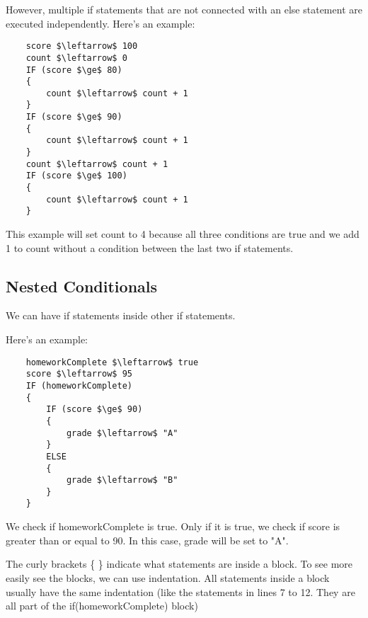 \documentclass{article}
\begin{document}
However, multiple if statements that are not connected with an else statement are executed independently. 
Here's an example:
\begin{lstlisting}
    score $\leftarrow$ 100
    count $\leftarrow$ 0
    IF (score $\ge$ 80)
    {
        count $\leftarrow$ count + 1
    }
    IF (score $\ge$ 90)
    {
        count $\leftarrow$ count + 1
    }
    count $\leftarrow$ count + 1
    IF (score $\ge$ 100)
    {
        count $\leftarrow$ count + 1
    }
\end{lstlisting}

This example will set count to 4 because all three conditions are true and we add 1 to count without a condition between the last two if statements.

\subsection*{Nested Conditionals}

We can have if statements inside other if statements.

Here's an example:
\begin{lstlisting}
    homeworkComplete $\leftarrow$ true
    score $\leftarrow$ 95
    IF (homeworkComplete)
    {
        IF (score $\ge$ 90)
        {
            grade $\leftarrow$ "A"
        }
        ELSE
        {
            grade $\leftarrow$ "B"
        }
    }
\end{lstlisting}
We check if homeworkComplete is true. Only if it is true, we check if score is greater than or equal to 90. In this case, grade will be set to "A".

The curly brackets \{ \} indicate what statements are inside a block. To see more easily see the blocks, we can use indentation. 
All statements inside a block usually have the same indentation (like the statements in lines 7 to 12. They are all part of the if(homeworkComplete) block)
\end{document}
